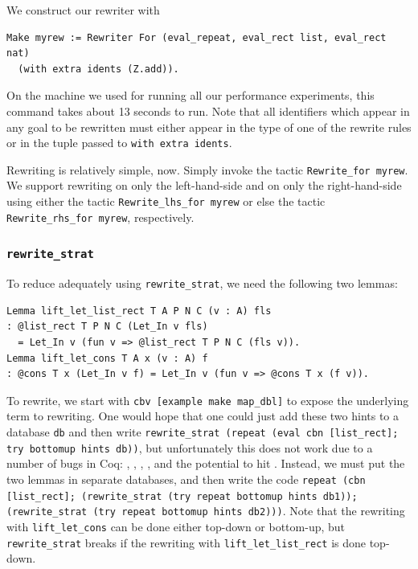 \begin{subappendices}
We construct our rewriter with
\begin{verbatim}
Make myrew := Rewriter For (eval_repeat, eval_rect list, eval_rect nat)
  (with extra idents (Z.add)).
\end{verbatim}
On the machine we used for running all our performance experiments, this command takes about 13 seconds to run.
Note that all identifiers which appear in any goal to be rewritten must either appear in the type of one of the rewrite rules or in the tuple passed to \texttt{with extra idents}.

Rewriting is relatively simple, now.
Simply invoke the tactic \texttt{Rewrite_for myrew}.
We support rewriting on only the left-hand-side and on only the right-hand-side using either the tactic \texttt{Rewrite_lhs_for myrew} or else the tactic \texttt{Rewrite_rhs_for myrew}, respectively.

\subsubsection{\texorpdfstring{\texttt{rewrite\_strat}}{rewrite\_strat}}

To reduce adequately using \texttt{rewrite\_strat}, we need the following two lemmas:
\begin{verbatim}
Lemma lift_let_list_rect T A P N C (v : A) fls
: @list_rect T P N C (Let_In v fls)
  = Let_In v (fun v => @list_rect T P N C (fls v)).
Lemma lift_let_cons T A x (v : A) f
: @cons T x (Let_In v f) = Let_In v (fun v => @cons T x (f v)).
\end{verbatim}

To rewrite, we start with \texttt{cbv [example make map_dbl]} to expose the underlying term to rewriting.
One would hope that one could just add these two hints to a database \texttt{db} and then write \texttt{rewrite\_strat (repeat (eval cbn [list\_rect]; try bottomup hints db))}, but unfortunately this does not work due to a number of bugs in Coq: , , , , and the potential to hit .
Instead, we must put the two lemmas in separate databases, and then write the code \texttt{repeat (cbn [list\_rect]; (rewrite\_strat (try repeat bottomup hints db1)); (rewrite\_strat (try repeat bottomup hints db2)))}.
Note that the rewriting with \texttt{lift_let_cons} can be done either top-down or bottom-up, but \texttt{rewrite\_strat} breaks if the rewriting with \texttt{lift_let_list_rect} is done top-down.


\end{subappendices}
